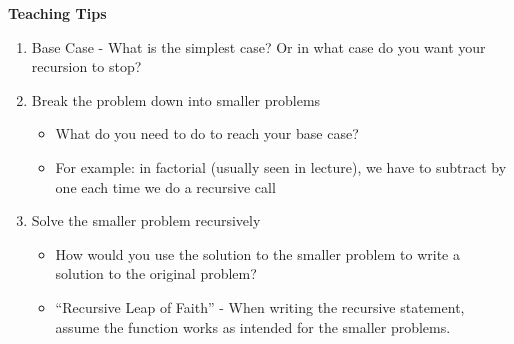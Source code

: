 \begin{guide}
\begin{blocksection}
\textbf{Teaching Tips}
\begin{enumerate}
	    \item Base Case - What is the simplest case? Or in what case do you want your recursion to stop?
	    \item Break the problem down into smaller problems
	    \begin{itemize}
			\item What do you need to do to reach your base case?
			\item For example: in factorial (usually seen in lecture), we have to subtract by one each time we do a recursive call
		\end{itemize}
		\item Solve the smaller problem recursively
		\begin{itemize}
			\item How would you use the solution to the smaller problem to write a solution to the original problem?
			\item “Recursive Leap of Faith” - When writing the recursive statement, assume the function works as intended for the smaller problems.
		\end{itemize}
\end{enumerate}
\end{blocksection}
\end{guide}
